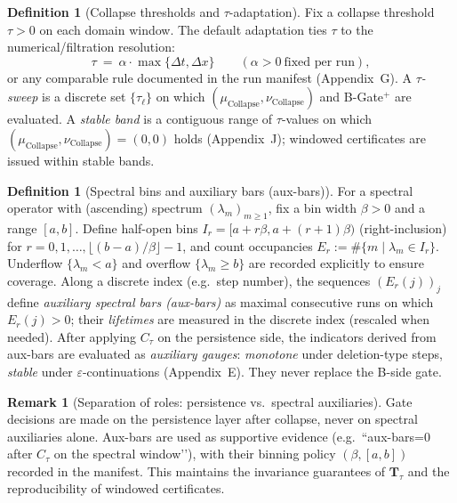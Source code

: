 \documentclass[11pt]{article}
\numberwithin{equation}{section}
\theoremstyle{definition}
\newtheorem{definition}[theorem]{Definition}
\newtheorem{remark}[theorem]{Remark}
\begin{document}
\begin{definition}[Collapse thresholds and $\tau$-adaptation]\label{def:tau-adapt}
Fix a collapse threshold \(\tau>0\) on each domain window. The default adaptation ties \(\tau\) to the numerical/filtration resolution:
\[
\tau\ =\ \alpha\cdot \max\{\Delta t,\Delta x\}\qquad (\alpha>0\ \text{fixed per run}),
\]
or any comparable rule documented in the run manifest (Appendix~G). A \emph{$\tau$-sweep} is a discrete set \(\{\tau_\ell\}\) on which \((\mu_{\mathrm{Collapse}},\nu_{\mathrm{Collapse}})\) and B-Gate\(^{+}\) are evaluated. A \emph{stable band} is a contiguous range of \(\tau\)-values on which \((\mu_{\mathrm{Collapse}},\nu_{\mathrm{Collapse}})=(0,0)\) holds (Appendix~J); windowed certificates are issued within stable bands.
\end{definition}

\begin{definition}[Spectral bins and auxiliary bars (aux-bars)]\label{def:aux-bars}
For a spectral operator with (ascending) spectrum \((\lambda_m)_{m\ge 1}\), fix a bin width \(\beta>0\) and a range \([a,b]\). Define half-open bins \(I_r=[a+r\beta,a+(r+1)\beta)\) (right-inclusion) for \(r=0,1,\dots,\lfloor (b-a)/\beta\rfloor-1\), and count occupancies \(E_r:=\#\{m\mid \lambda_m\in I_r\}\). Underflow \(\{\lambda_m<a\}\) and overflow \(\{\lambda_m\ge b\}\) are recorded explicitly to ensure coverage. Along a discrete index (e.g.\ step number), the sequences \((E_r(j))_j\) define \emph{auxiliary spectral bars (aux-bars)} as maximal consecutive runs on which \(E_r(j)>0\); their \emph{lifetimes} are measured in the discrete index (rescaled when needed). After applying \(C_\tau\) on the persistence side, the indicators derived from aux-bars are evaluated as \emph{auxiliary gauges}: \emph{monotone} under deletion-type steps, \emph{stable} under \(\varepsilon\)-continuations (Appendix~E). They never replace the B-side gate.
\end{definition}

\begin{remark}[Separation of roles: persistence vs.\ spectral auxiliaries]\label{rem:sep-persist-spectral}
Gate decisions are made on the persistence layer after collapse, never on spectral auxiliaries alone. Aux-bars are used as supportive evidence (e.g.\ “aux-bars=0 after $C_\tau$ on the spectral window’’), with their binning policy \((\beta,[a,b])\) recorded in the manifest. This maintains the invariance guarantees of \(\mathbf{T}_\tau\) and the reproducibility of windowed certificates.
\end{remark}
\end{document}
